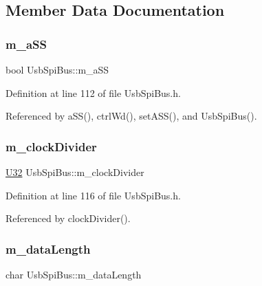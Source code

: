 \subsection{Member Data Documentation}
\mbox{\label{classUsbSpiBus_ac98d088ac8aed042f65cbd918fc538ae}} 
\subsubsection{\texorpdfstring{m\+\_\+a\+SS}{m\_aSS}}
{\footnotesize\ttfamily bool Usb\+Spi\+Bus\+::m\+\_\+a\+SS\hspace{0.3cm}{\ttfamily [private]}}



Definition at line 112 of file Usb\+Spi\+Bus.\+h.



Referenced by a\+S\+S(), ctrl\+Wd(), set\+A\+S\+S(), and Usb\+Spi\+Bus().

\mbox{\label{classUsbSpiBus_a5a4de2b61018f52b885559ce07bd3161}} 
\subsubsection{\texorpdfstring{m\+\_\+clock\+Divider}{m\_clockDivider}}
{\footnotesize\ttfamily \hyperlink{classUsbSpiBus_a9b24e28662a35ca57f5ed32c41c5f3ff}{U32} Usb\+Spi\+Bus\+::m\+\_\+clock\+Divider\hspace{0.3cm}{\ttfamily [private]}}



Definition at line 116 of file Usb\+Spi\+Bus.\+h.



Referenced by clock\+Divider().

\mbox{\label{classUsbSpiBus_a2d8b2bddd6d4d5dc53c38b5698737c5c}} 
\subsubsection{\texorpdfstring{m\+\_\+data\+Length}{m\_dataLength}}
{\footnotesize\ttfamily char Usb\+Spi\+Bus\+::m\+\_\+data\+Length\hspace{0.3cm}{\ttfamily [private]}}



